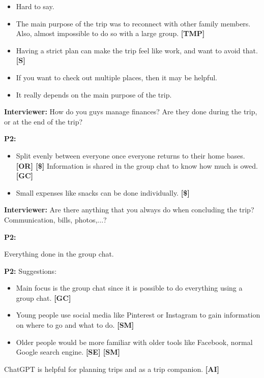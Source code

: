 \documentclass[12pt,a4paper]{article}
\begin{document}
\begin{itemize}
    \item Hard to say.
    \item The main purpose of the trip was to reconnect with other family members. 
Also, almost impossible to do so with a large group. \textbf{[TMP]}

    \item Having a strict plan can make the trip feel like work, and want to avoid that. \textbf{[S]}
    \item If you want to check out multiple places, then it may be helpful. 
    \item It really depends on the main purpose of the trip. 
\end{itemize}

\textbf{Interviewer: }How do you guys manage finances? Are they done during the trip, or at the end of the trip? 

\textbf{P2: }

\begin{itemize}
    \item Split evenly between everyone once everyone returns to their home bases. \textbf{[OR] [\$]}
Information is shared in the group chat to know how much is owed. \textbf{[GC]}

    \item Small expenses like snacks can be done individually. \textbf{[\$]}
\end{itemize}

\textbf{Interviewer: }Are there anything that you always do when concluding the trip? Communication, bills, photos,...?  

\textbf{P2: }

Everything done in the group chat.

\textbf{P2:} Suggestions:

\begin{itemize}
    \item Main focus is the group chat since it is possible to do everything using a group chat. \textbf{[GC]}
    \item Young people use social media like Pinterest or Instagram to gain information on where to go and what to do. \textbf{[SM]}
    \item Older people would be more familiar with older tools like Facebook, normal Google search engine. \textbf{[SE] [SM]}
\end{itemize}
ChatGPT is helpful for planning trips and as a trip companion. \textbf{[AI]}
\end{document}
